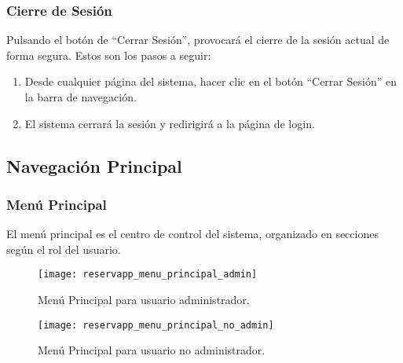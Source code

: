 \subsubsection{Cierre de Sesión}
Pulsando el botón de ``Cerrar Sesión'', provocará el cierre de la sesión actual de forma segura. Estos son los pasos a seguir:

\begin{enumerate}
   \item Desde cualquier página del sistema, hacer clic en el botón ``Cerrar Sesión'' en la barra de navegación.
   \item El sistema cerrará la sesión y redirigirá a la página de login.
\end{enumerate}

\subsection{Navegación Principal}

\subsubsection{Menú Principal}
El menú principal es el centro de control del sistema, organizado en secciones según el rol del usuario.

\begin{figure}[H]
	\centering
		\texttt{[image: reservapp\_menu\_principal\_admin]}
	\caption{Menú Principal para usuario administrador.}
	\label{fig:reservapp_menu_principal_admin}
\end{figure}

\begin{figure}[H]
	\centering
		\texttt{[image: reservapp\_menu\_principal\_no\_admin]}
	\caption{Menú Principal para usuario no administrador.}
	\label{fig:reservapp_menu_principal_no_admin}
\end{figure}

